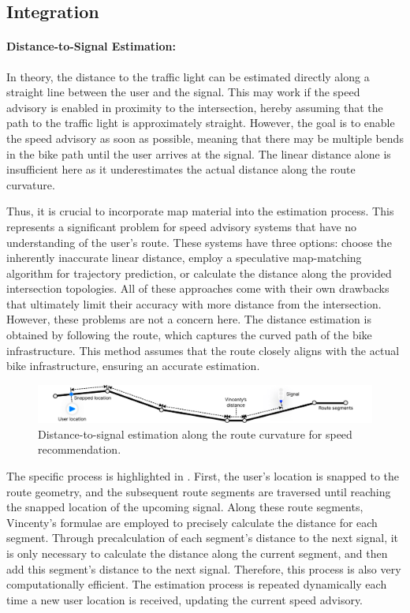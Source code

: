 \subsection{Integration}

\paragraph{Distance-to-Signal Estimation:} In theory, the distance to the traffic light can be estimated directly along a straight line between the user and the signal. This may work if the speed advisory is enabled in proximity to the intersection, hereby assuming that the path to the traffic light is approximately straight. However, the goal is to enable the speed advisory as soon as possible, meaning that there may be multiple bends in the bike path until the user arrives at the signal. The linear distance alone is insufficient here as it underestimates the actual distance along the route curvature. 

Thus, it is crucial to incorporate map material into the estimation process. This represents a significant problem for speed advisory systems that have no understanding of the user's route. These systems have three options: choose the inherently inaccurate linear distance, employ a speculative map-matching algorithm for trajectory prediction, or calculate the distance along the provided intersection topologies. All of these approaches come with their own drawbacks that ultimately limit their accuracy with more distance from the intersection. However, these problems are not a concern here. The distance estimation is obtained by following the route, which captures the curved path of the bike infrastructure. This method assumes that the route closely aligns with the actual bike infrastructure, ensuring an accurate estimation.

\begin{figure}[htbp]
\centering
\includegraphics[width=\linewidth]{images/distance-to-signal-estimation.pdf}
\caption{Distance-to-signal estimation along the route curvature for speed recommendation.}
\label{fig:distance-to-signal-estimation}
\end{figure}

The specific process is highlighted in . First, the user's location is snapped to the route geometry, and the subsequent route segments are traversed until reaching the snapped location of the upcoming signal. Along these route segments, Vincenty's formulae are employed to precisely calculate the distance for each segment. Through precalculation of each segment's distance to the next signal, it is only necessary to calculate the distance along the current segment, and then add this segment's distance to the next signal. Therefore, this process is also very computationally efficient. The estimation process is repeated dynamically each time a new user location is received, updating the current speed advisory.

